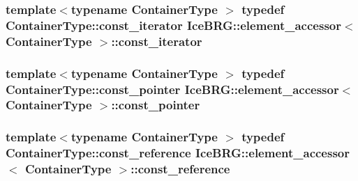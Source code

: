 \subsubsection[{const\+\_\+iterator}]{\setlength{\rightskip}{0pt plus 5cm}template$<$typename Container\+Type $>$ typedef Container\+Type\+::const\+\_\+iterator {\bf Ice\+B\+R\+G\+::element\+\_\+accessor}$<$ Container\+Type $>$\+::{\bf const\+\_\+iterator}}\label{classIceBRG_1_1element__accessor_ab9a6ca4866a0758171a4ffa7b0935cd2}
\hypertarget{classIceBRG_1_1element__accessor_ad2f50d3e3d10c61c85c167512221c7d1}{}
\subsubsection[{const\+\_\+pointer}]{\setlength{\rightskip}{0pt plus 5cm}template$<$typename Container\+Type $>$ typedef Container\+Type\+::const\+\_\+pointer {\bf Ice\+B\+R\+G\+::element\+\_\+accessor}$<$ Container\+Type $>$\+::{\bf const\+\_\+pointer}}\label{classIceBRG_1_1element__accessor_ad2f50d3e3d10c61c85c167512221c7d1}
\hypertarget{classIceBRG_1_1element__accessor_aa5a74be2decaa60d9080c4f1b4d3dcb8}{}
\subsubsection[{const\+\_\+reference}]{\setlength{\rightskip}{0pt plus 5cm}template$<$typename Container\+Type $>$ typedef Container\+Type\+::const\+\_\+reference {\bf Ice\+B\+R\+G\+::element\+\_\+accessor}$<$ Container\+Type $>$\+::{\bf const\+\_\+reference}}\label{classIceBRG_1_1element__accessor_aa5a74be2decaa60d9080c4f1b4d3dcb8}
\hypertarget{classIceBRG_1_1element__accessor_a32ea1ca6966b5093370f8944efedc471}{}
